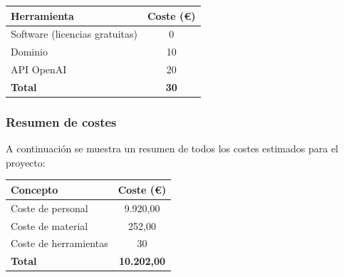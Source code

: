 \begin{center}
\begin{tabular}{|l|c|}
\hline
\textbf{Herramienta} & \textbf{Coste (€)} \\
\hline
Software (licencias gratuitas) & 0 \\
Dominio & 10 \\
API OpenAI & 20 \\
\hline
\textbf{Total} & \textbf{30} \\
\hline
\end{tabular}
\end{center}

\subsubsection{Resumen de costes}

A continuación se muestra un resumen de todos los costes estimados para el proyecto:

\begin{center}
\begin{tabular}{|l|c|}
\hline
\textbf{Concepto} & \textbf{Coste (€)} \\
\hline
Coste de personal & 9.920,00 \\
Coste de material & 252,00 \\
Coste de herramientas & 30 \\
\hline
\textbf{Total} & \textbf{10.202,00} \\
\hline
\end{tabular}
\end{center}